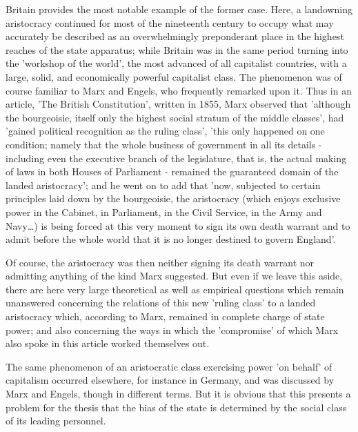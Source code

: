 Britain provides the most notable example of the former case. Here, a landowning aristocracy continued for most of the nineteenth century to occupy what may accurately be described as an overwhelmingly preponderant place in the highest reaches of the state apparatus; while Britain was in the same period turning into the 'workshop of the world', the most advanced of all capitalist countries, with a large, solid, and economically powerful capitalist class. The phenomenon was of course familiar to Marx and Engels, who frequently remarked upon it. Thus in an article, 'The British Constitution', written in 1855, Marx observed that 'although the bourgeoisie, itself only the highest social stratum of the middle classes', had 'gained political recognition as the ruling class', 'this only happened on one condition; namely that the whole business of government in all its details - including even the executive branch of the legislature, that is, the actual making of laws in both Houses of Parliament - remained the guaranteed domain of the landed aristocracy'; and he went on to add that 'now, subjected to certain principles laid down by the bourgeoisie, the aristocracy (which enjoys exclusive power in the Cabinet, in Parliament, in the Civil Service, in the Army and Navy\dots{}) is being forced at this very moment to sign its own death warrant and to admit before the whole world that it is no longer destined to govern England'.

Of course, the aristocracy was then neither signing its death warrant nor admitting anything of the kind Marx suggested. But even if we leave this aside, there are here very large theoretical as well as empirical questions which remain unanswered concerning the relations of this new 'ruling class' to a landed aristocracy which, according to Marx, remained in complete charge of state power; and also concerning the ways in which the 'compromise' of which Marx also spoke in this article worked themselves out.

The same phenomenon of an aristocratic class exercising power 'on behalf' of capitalism occurred elsewhere, for instance in Germany, and was discussed by Marx and Engels, though in different terms. But it is obvious that this presents a problem for the thesis that the bias of the state is determined by the social class of its leading personnel.

